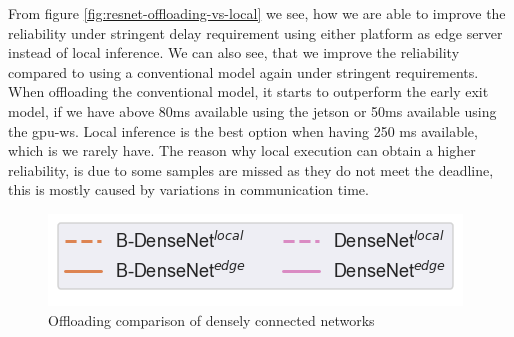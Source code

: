 From figure \ref{fig:resnet-offloading-vs-local} we see, how we are able to improve the reliability under stringent delay requirement using either platform as edge server instead of local inference. We can also see, that we improve the reliability compared to using a conventional model again under stringent requirements. When offloading the conventional model, it starts to outperform the early exit model, if we have above 80ms available using the \gls{jetson} or 50ms available using the \gls{gpu-ws}. Local inference is the best option when having 250 ms available, which is we rarely have. The reason why local execution can obtain a higher reliability, is due to some samples are missed as they do not meet the deadline, this is mostly caused by variations in communication time. 

\begin{figure}
	\captionsetup[subfigure]{justification=centering, farskip=0pt,captionskip=0pt}
	\centering
	\includegraphics[width=.3\linewidth]{figures/edge/gpu_b-densenet_offloading_vs_local_legend}
	\hfill
	\hfill
	\caption[Offloading comparison of densely connected networks]{Offloading comparison of densely connected networks}
	\label{fig:densenet-offloading-vs-local}
\end{figure}

